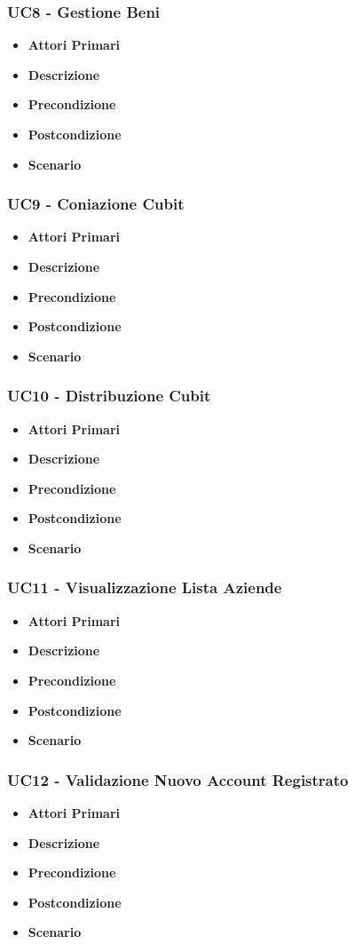 \subsubsection{UC8 - Gestione Beni}
\begin{itemize}
	\item \textbf{Attori Primari}
	\item \textbf{Descrizione}
	\item \textbf{Precondizione}
	\item \textbf{Postcondizione}
	\item \textbf{Scenario}
\end{itemize}
\subsubsection{UC9 -  Coniazione Cubit}
\begin{itemize}
	\item \textbf{Attori Primari}
	\item \textbf{Descrizione}
	\item \textbf{Precondizione}
	\item \textbf{Postcondizione}
	\item \textbf{Scenario}
\end{itemize}
\subsubsection{UC10 - Distribuzione Cubit}
\begin{itemize}
	\item \textbf{Attori Primari}
	\item \textbf{Descrizione}
	\item \textbf{Precondizione}
	\item \textbf{Postcondizione}
	\item \textbf{Scenario}
\end{itemize}
\subsubsection{UC11 - Visualizzazione Lista Aziende}
\begin{itemize}
	\item \textbf{Attori Primari}
	\item \textbf{Descrizione}
	\item \textbf{Precondizione}
	\item \textbf{Postcondizione}
	\item \textbf{Scenario}
\end{itemize}
\subsubsection{UC12 - Validazione Nuovo Account Registrato}
\begin{itemize}
	\item \textbf{Attori Primari}
	\item \textbf{Descrizione}
	\item \textbf{Precondizione}
	\item \textbf{Postcondizione}
	\item \textbf{Scenario}
\end{itemize}

